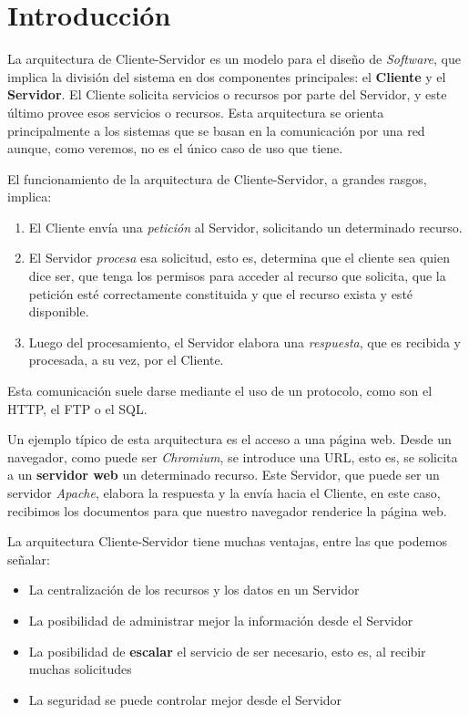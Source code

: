 \documentclass[11pt]{article}
\begin{document}

\newpage

\tableofcontents
\newpage

\section{Introducción}

La arquitectura de Cliente-Servidor es un modelo para el diseño de
\emph{Software}, que implica la división del sistema en dos componentes 
principales: el \textbf{Cliente} y el \textbf{Servidor}. El Cliente solicita
servicios o recursos por parte del Servidor, y este último provee esos servicios 
o recursos. Esta arquitectura se orienta principalmente a los sistemas que se 
basan en la comunicación por una red aunque, como veremos, no es el único caso 
de uso que tiene.

El funcionamiento de la arquitectura de Cliente-Servidor, a grandes rasgos, 
implica:
\begin{enumerate}
    \item El Cliente envía una \emph{petición} al Servidor, solicitando un 
    determinado recurso.

    \item El Servidor \emph{procesa} esa solicitud, esto es, determina que el 
    cliente sea quien dice ser, que tenga los permisos para acceder al recurso 
    que solicita, que la petición esté correctamente constituida y que el 
    recurso exista y esté disponible.
    
    \item Luego del procesamiento, el Servidor elabora una \emph{respuesta}, 
    que es recibida y procesada, a su vez, por el Cliente.
\end{enumerate}

Esta comunicación suele darse mediante el uso de un protocolo, como son el HTTP,
el FTP o el SQL. 

Un ejemplo típico de esta arquitectura es el acceso a una página web. Desde un 
navegador, como puede ser \emph{Chromium}, se introduce una URL, esto es, se 
solicita a un \textbf{servidor web} un determinado recurso. Este Servidor, que 
puede ser un servidor \emph{Apache}, elabora la respuesta y la envía hacia el 
Cliente, en este caso, recibimos los documentos para que nuestro navegador 
renderice la página web.

La arquitectura Cliente-Servidor tiene muchas ventajas, entre las que podemos 
señalar:
\begin{itemize}
    \item La centralización de los recursos y los datos en un Servidor 
    
    \item La posibilidad de administrar mejor la información desde el Servidor 
    
    \item La posibilidad de \textbf{escalar} el servicio de ser necesario, esto 
    es, al recibir muchas solicitudes
    
    \item La seguridad se puede controlar mejor desde el Servidor
\end{itemize}
\end{document}
